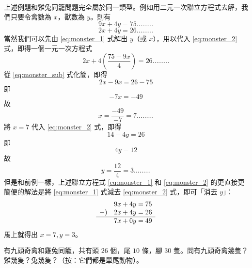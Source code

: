 \begin{solution*}
上述例題和雞兔同籠問題完全屬於同一類型。例如用二元一次聯立方程式去解，我們只要令禽數為 $x$，獸數為 $y$。則有
\begin{equation}\label{eq:monster_1}
  9x+4y = 75 \dots\dots\dots
\end{equation}
\begin{equation}\label{eq:monster_2}
  2x+4y = 26 \dots\dots\dots
\end{equation}
當然我們可以先由 \eqref{eq:monster_1} 式解出 $y$（或 $x$），用以代入 \eqref{eq:monster_2} 式，即得一個一元一次方程式
\begin{equation}\label{eq:monster_sub}
  2x + 4 \left( \frac{75-9x}{4} \right) = 26 \dots\dots\dots
\end{equation}
從 \eqref{eq:monster_sub} 式化簡，即得
\begin{equation*}
  2x - 9x = 26 - 75
\end{equation*}
即
\begin{equation*}
  -7x = -49
\end{equation*}
故
\begin{equation}\label{eq:monster_sol_x}
  x = \frac{-49}{-7} = 7 \dots\dots\dots
\end{equation}
將 $x=7$ 代入 \eqref{eq:monster_2} 式，即得
\begin{equation*}
  14 + 4y = 26
\end{equation*}
即
\begin{equation*}
  4y = 12
\end{equation*}
故
\begin{equation}\label{eq:monster_sol_y}
  y = \frac{12}{4} = 3 \dots\dots\dots
\end{equation}
但是和前例一樣，上述聯立方程式 \eqref{eq:monster_1} 和 \eqref{eq:monster_2} 的更直接更簡便的解法是將 \eqref{eq:monster_1} 式減去 \eqref{eq:monster_2} 式，即可「消去 $y$」：
\begin{equation*}
\begin{array}{r@{\quad}l}
  & 9x + 4y = 75 \\
  -) & 2x + 4y = 26 \\ \hline
  & 7x + 0y = 49
\end{array}
\end{equation*}
馬上就得出 $x=7, y=3$。
\end{solution*}

\begin{example}\label{ex:4-3-3}
有九頭奇禽和雞兔同籠，共有頭 $26$ 個，尾 $10$ 條，腳 $30$ 隻。問有九頭奇禽幾隻？雞幾隻？兔幾隻？（按：它們都是單尾動物）。
\end{example}

